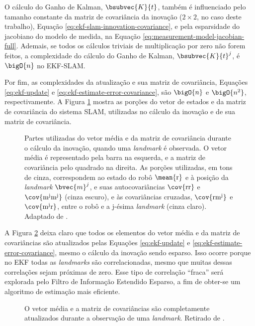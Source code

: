 O cálculo do Ganho de Kalman, $\bsubvec{K}{t}$, também é influenciado pelo 
tamanho constante da matriz de covariância da inovação ($2\times 2$, no caso deste trabalho), Equação \ref{eq:ekf-slam-innovation-covariance}, e pela esparsidade do jacobiano do modelo de medida, na Equação \ref{eq:measurement-model-jacobian-full}. Ademais, se todos os cálculos triviais de multiplicação por zero não forem feitos, a complexidade do cálculo do Ganho de Kalman, $\bsubvec{K}{t}^j$, é $\bigO{n}$ no EKF-SLAM.

Por fim, as complexidades da atualização e sua matriz de covariância, Equações \ref{eq:ekf-update} e \ref{eq:ekf-estimate-error-covariance}, são $\bigO{n}$ e $\bigO{n^2}$, respectivamente. A Figura \ref{fig:ekf-slam-innovation} mostra as porções 
do vetor de estados e da matriz de covariância do sistema SLAM, utilizadas no cálculo da inovação e de sua matriz de covariância.

\begin{figure}[h]
  \centering
  
  \caption{Partes utilizadas do vetor média e da matriz de covariância durante o cálculo da inovação, quando uma \textit{landmark} é observada. O vetor média é representado pela barra na esquerda, e a matriz de covariância pelo quadrado na direita. As porções utilizadas, em tons de cinza, correspondem ao estado do robô $\mean{\mathrm{r}}$ e à posição da \textit{landmark} $\bvec{m}^j$, e suas autocovariâncias $\cov{\mathrm{rr}}$ e $\cov{\mathrm{m^j m^j}}$ (cinza escuro), e às covariâncias cruzadas, $\cov{\mathrm{r m^j}}$ e $\cov{\mathrm{m^j r}}$, entre o robô e a j-ésima \textit{landmark} (cinza claro). Adaptado de \cite[p.~8]{jsola}.}
  \label{fig:ekf-slam-innovation}
\end{figure}

A Figura \ref{fig:ekf-slam-update} deixa claro que todos os elementos do vetor média e da 
matriz de covariâncias são atualizados pelas Equações \ref{eq:ekf-update} e \ref{eq:ekf-estimate-error-covariance}, mesmo o cálculo da inovação sendo esparso. Isso ocorre porque no EKF todas as \textit{landmarks} são 
correlacionadas, mesmo que muitas dessas correlações sejam próximas de zero. 
Esse tipo de correlação ``fraca'' será explorada pelo Filtro de Informação Estendido Esparso, a fim de obter-se um algoritmo de estimação mais eficiente.

\begin{figure}[h]
  \centering
  
  \caption{O vetor média e a matriz de covariâncias são completamente atualizados durante a observação de uma \textit{landmark}. Retirado de \cite[p.~8]{jsola}.}
  \label{fig:ekf-slam-update}
\end{figure}

